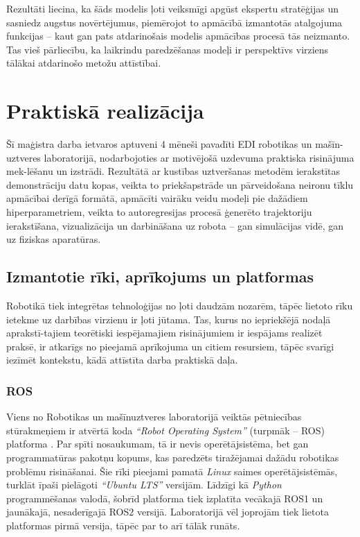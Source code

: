 \documentclass[12pt, a4paper]{article}
\numberwithin{equation}{section} %
\begin{document}
Rezultāti liecina, ka šāds modelis ļoti veiksmīgi apgūst ekspertu stratēģijas un sasniedz augstus novērtējumus, piemērojot to apmācībā izmantotās atalgojuma funkcijas -- kaut gan pats atdarinošais modelis apmācības procesā tās neizmanto. Tas vieš pārliecību, ka laikrindu paredzēšanas modeļi ir perspektīvs virziens tālākai atdarinošo metožu attīstībai.



%
%
%
%
%
%
%
%
%
%
%
%
%
%
%
%
%
%
%

\newpage
\section{Praktiskā realizācija}

Šī maģistra darba ietvaros aptuveni 4 mēneši pavadīti EDI robotikas un mašīn-uztveres laboratorijā, nodarbojoties ar motivējošā uzdevuma praktiska risinājuma mek-lēšanu un izstrādi. Rezultātā ar kustības uztveršanas metodēm ierakstītas demonstrāciju datu kopas, veikta to priekšapstrāde un pārveidošana neironu tīklu apmācībai derīgā formātā, apmācīti vairāku veidu modeļi pie dažādiem hiperparametriem, veikta to autoregresijas procesā ģenerēto trajektoriju ierakstīšana, vizualizācija un darbināšana uz robota -- gan simulācijas vidē, gan uz fiziskas aparatūras.


\subsection{Izmantotie rīki, aprīkojums un platformas}

Robotikā tiek integrētas tehnoloģijas no ļoti daudzām nozarēm, tāpēc lietoto rīku ietekme uz darbības virzienu ir ļoti jūtama. Tas, kurus no iepriekšējā nodaļā aprakstī-tajiem teorētiski iespējamajiem risinājumiem ir iespājams realizēt praksē, ir atkarīgs no pieejamā aprīkojuma un citiem resursiem, tāpēc svarīgi iezīmēt kontekstu, kādā attīstīta darba praktiskā daļa.

\subsubsection{ROS}

Viens no Robotikas un mašīnuztveres laboratorijā veiktās pētniecības stūrakmeņiem ir atvērtā koda \textit{``Robot Operating System''} (turpmāk -- ROS) platforma \cite{ros_org}. Par spīti nosaukumam, tā ir nevis operētājsistēma, bet gan programmatūras pakotņu kopums, kas paredzēts tiražējamai dažādu robotikas problēmu risināšanai. Šie rīki pieejami pamatā \textit{Linux} saimes operētājsistēmās, turklāt īpaši pielāgoti \textit{``Ubuntu LTS''} versijām. Līdzīgi kā \textit{Python} programmēšanas valodā, šobrīd platforma tiek izplatīta vecākajā ROS1 un jaunākajā, nesaderīgajā ROS2 versijā. Laboratorijā vēl joprojām tiek lietota platformas pirmā versija, tāpēc par to arī tālāk runāts.
\end{document}
